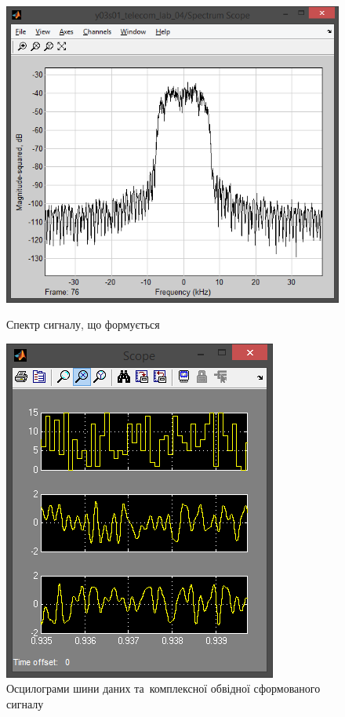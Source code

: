 \documentclass[
	a4paper,
	oneside,
	BCOR = 10mm,
	DIV = 12,
	12pt,
	headings = normal,
]{scrartcl}
\begin{document}
				\begin{figure}[!htbp]
					\begin{minipage}[t]{0.5\textwidth - 0.5em}
						\centering
						\includegraphics[height = 8\baselineskip]{../01-solution/rolloff-0p6-spectrum-scope.png}
						\caption{Спектр сигналу, що формується}
						\label{fig:rolloff-0p6-spectrum-scope}
					\end{minipage}\hspace{1em}%
					\begin{minipage}[t]{0.5\textwidth - 0.5em}
						\centering
						\includegraphics[height = 8\baselineskip]{../01-solution/rolloff-0p6-scope.png}
						\caption{Осцилограми шини даних та~комплексної обвідної сформованого сигналу}
						\label{fig:rolloff-0p6-scope}
					\end{minipage}%
				\end{figure}
\end{document}
